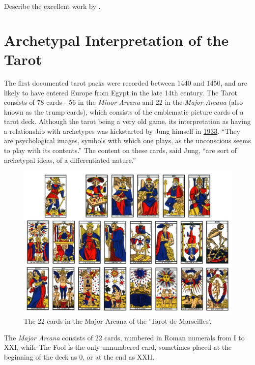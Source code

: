 \documentclass[]{book}
\begin{document}
Describe the excellent work by \citet{lequellec2013jung}.

\hypertarget{archetypal-interpretation-of-the-tarot}{%
\section{Archetypal Interpretation of the Tarot}\label{archetypal-interpretation-of-the-tarot}}

The first documented tarot packs were recorded between 1440 and 1450, and are likely to have entered Europe from Egypt in the late 14th century. The Tarot consists of 78 cards - 56 in the \emph{Minor Arcana} and 22 in the \emph{Major Arcana} (also known as the trump cards), which consists of the emblematic picture cards of a tarot deck. Although the tarot being a very old game, its interpretation as having a relationship with archetypes was kickstarted by Jung himself in \href{https://marykgreer.com/2008/03/31/carl-jung-and-tarot/}{1933}. ``They are psychological images, symbols with which one plays, as the unconscious seems to play with its contents.'' The content on these cards, said Jung, ``are sort of archetypal ideas, of a differentiated nature.''

\begin{figure}

{\centering \includegraphics[width=\textwidth]{img/tarot} 

}

\caption{The 22 cards in the Major Arcana of the 'Tarot de Marseilles'.}\label{fig:unnamed-chunk-3}
\end{figure}

The \emph{Major Arcana} consists of 22 cards, numbered in Roman numerals from I to XXI, while The Fool is the only unnumbered card, sometimes placed at the beginning of the deck as 0, or at the end as XXII.
\end{document}
